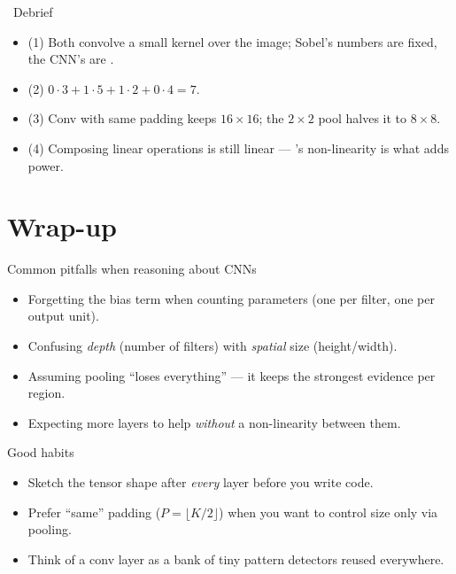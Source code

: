 \documentclass[10pt,aspectratio=169]{beamer}
\begin{document}
\begin{frame}{\faPen~Debrief}
  \begin{itemize}
    \item (1) Both convolve a small kernel over the image; Sobel's numbers are fixed, the CNN's are .
    \item (2) $0\cdot3+1\cdot5+1\cdot2+0\cdot4 = 7$.
    \item (3) Conv with same padding keeps $16\times16$; the $2\times2$ pool halves it to $8\times8$.
    \item (4) Composing linear operations is still linear --- 's non-linearity is what adds power.
  \end{itemize}
\end{frame}

\section{Wrap-up}

\begin{frame}{Common pitfalls when reasoning about CNNs}
  \begin{badbox}
    \begin{itemize}
      \item Forgetting the bias term when counting parameters (one per filter, one per output unit).
      \item Confusing \emph{depth} (number of filters) with \emph{spatial} size (height/width).
      \item Assuming pooling ``loses everything'' --- it keeps the strongest evidence per region.
      \item Expecting more layers to help \emph{without} a non-linearity between them.
    \end{itemize}
  \end{badbox}
\end{frame}

\begin{frame}{Good habits}
  \begin{goodbox}
    \begin{itemize}
      \item Sketch the tensor shape after \emph{every} layer before you write code.
      \item Prefer ``same'' padding ($P=\lfloor K/2\rfloor$) when you want to control size only via pooling.
      \item Think of a conv layer as a bank of tiny pattern detectors reused everywhere.
    \end{itemize}
  \end{goodbox}
\end{frame}
\end{document}
